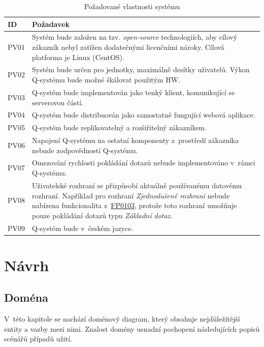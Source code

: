 \documentclass[thesis=M,czech]{FITthesis}[2019/12/23]
\begin{document}
\label{NefunkcniPozadavky}
\begin{table}[H]
	\centering
	\begin{tabular}{|p{}|p{}|}
		\hline
  		{\textbf{ID}} & {\textbf{Požadavek}} \\
  		\hline \hline
		PV01 & Systém bude založen na tzv. \textit{open-source} technologiích, aby cílový zákazník nebyl zatížen dodatečnými licenčními nároky. Cílová platforma je Linux (CentOS). \\ \hline
		PV02 & Systém bude určen pro jednotky, maximálně desítky uživatelů. Výkon Q-systému bude možné škálovat použitým HW. \\ \hline
		PV03 & Q-systém bude implementován jako tenký klient, komunikující se serverovou částí. \\ \hline
		PV04 & Q-systém bude distribuován jako samostatně fungující webová aplikace. \\ \hline
		PV05 & Q-systém bude replikovatelný a rozšiřitelný zákazníkem. \\ \hline
		PV06 & Napojení Q-systému na ostatní komponenty z~prostředí zákazníka nebude zodpovědností Q-systému. \\ \hline
		PV07 & Omezování rychlosti pokládání dotazů nebude implementováno v~rámci Q-systému. \\ \hline
		PV08 & Uživatelské rozhraní se přizpůsobí aktuálně používanému datovému rozhraní. Například pro rozhraní \textit{Zjednodušené rozhraní} nebude nabízena funkcionalita z~\hyperref[FP0103]{FP0103}, protože toto rozhraní umožňuje pouze pokládání dotazů typu \textit{Základní dotaz}. \\ \hline
		PV09 & Q-systém bude v~českém jazyce. \\ \hline
	\end{tabular}
 	\caption{Požadované vlastnosti systému}
\label{tab:Požadované vlastnosti systému}
\end{table}

\chapter{Návrh}
\label{Navrh}

\section{Doména}
V~této kapitole se nachází doménový diagram, který obsahuje nejdůležitější entity a vazby mezi nimi. Znalost domény usnadní pochopení následujících popisů scénářů případů užití.
\end{document}
